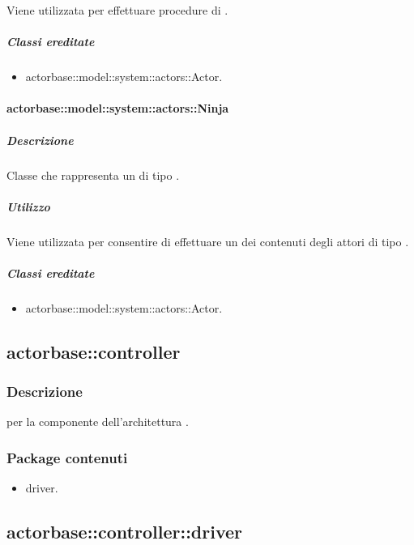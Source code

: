 \documentclass{scalatekids-article}
\begin{document}
Viene utilizzata per effettuare procedure di .

\subparagraph{Classi ereditate}

\begin{itemize}
\item actorbase::model::system::actors::Actor.
\end{itemize}

\paragraph{actorbase::model::system::actors::Ninja}

\subparagraph{Descrizione}

Classe che rappresenta un  di tipo .

\subparagraph{Utilizzo}

Viene utilizzata per consentire di effettuare un  dei contenuti degli attori di tipo .

\subparagraph{Classi ereditate}

\begin{itemize}
\item actorbase::model::system::actors::Actor.
\end{itemize}

\subsection{actorbase::controller}

\subsubsection{Descrizione}

 per la componente  dell'architettura .

\subsubsection{Package contenuti}

\begin{itemize}
\item driver.
\end{itemize}

\subsection{actorbase::controller::driver}
\end{document}
